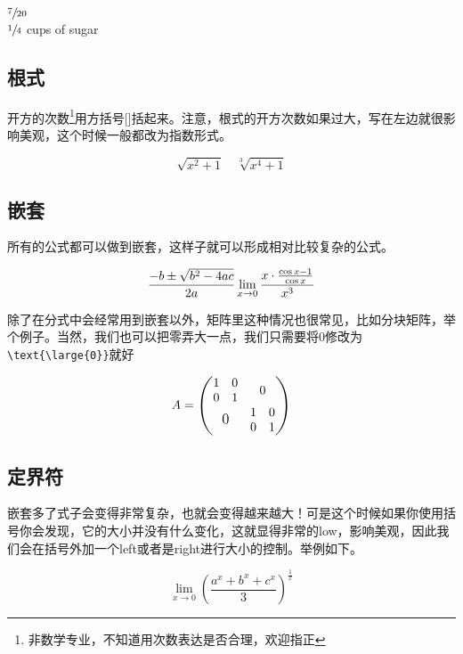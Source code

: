 \begin{codeshow}
\\
$ \sfrac{7}{20} $\\
$\sfrac{1}{4}$ cups of sugar
\end{codeshow}

\subsection{根式}
开方的次数\footnote{非数学专业，不知道用次数表达是否合理，欢迎指正}用方括号[]括起来。注意，根式的开方次数如果过大，写在左边就很影响美观，这个时候一般都改为指数形式。
\begin{codeshow}
\[
\sqrt{x^2+1}\quad \sqrt[3]{x^4+1}
\]
\end{codeshow}

\subsection{嵌套}
所有的公式都可以做到嵌套，这样子就可以形成相对比较复杂的公式。
\begin{codeshow}
\[
\frac{-b\pm \sqrt{b^{2}-4ac}}{2a}\\
\lim\limits_{x\to 0}\frac
{x\cdot \frac{\cos x -1}{\cos x}}{x^{3}}
\]
\end{codeshow}

除了在分式中会经常用到嵌套以外，矩阵里这种情况也很常见，比如分块矩阵，举个例子。当然，我们也可以把零弄大一点，我们只需要将0修改为\lstinline|\text{\large{0}}|就好
\begin{codeshow}
\[
A=\begin{pmatrix}
\begin{matrix}
1 & 0 \\
0 & 1
\end{matrix} & 0 \\
\text{\large{0}} & \begin{matrix}
1 & 0 \\
0 & 1
\end{matrix}
\end{pmatrix}
\]
\end{codeshow}

\subsection{定界符}
嵌套多了式子会变得非常复杂，也就会变得越来越大！可是这个时候如果你使用括号你会发现，它的大小并没有什么变化，这就显得非常的low，影响美观，因此我们会在括号外加一个left或者是right进行大小的控制。举例如下。
\begin{codeshow}
\[
\lim\limits_{x\to 0}\left(\frac
{a^{x}+b^{x}+c^{x}}{3}\right)
^{\tfrac{1}{x}}
\]
\end{codeshow}

